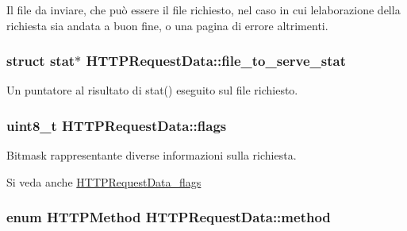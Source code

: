 Il file da inviare, che può essere il file richiesto, nel caso in cui l\textquotesingle{}elaborazione della richiesta sia andata a buon fine, o una pagina di errore altrimenti. 

\hypertarget{structHTTPRequestData_acf9615119994e2784a395f3b5b80f710}{}
\subsubsection[{file\+\_\+to\+\_\+serve\+\_\+stat}]{\setlength{\rightskip}{0pt plus 5cm}struct stat$\ast$ H\+T\+T\+P\+Request\+Data\+::file\+\_\+to\+\_\+serve\+\_\+stat}\label{structHTTPRequestData_acf9615119994e2784a395f3b5b80f710}


Un puntatore al risultato di stat() eseguito sul file richiesto. 

\hypertarget{structHTTPRequestData_ac3bd527bd3e00ce219bfa72dbaea2351}{}
\subsubsection[{flags}]{\setlength{\rightskip}{0pt plus 5cm}uint8\+\_\+t H\+T\+T\+P\+Request\+Data\+::flags}\label{structHTTPRequestData_ac3bd527bd3e00ce219bfa72dbaea2351}


Bitmask rappresentante diverse informazioni sulla richiesta. 

\begin{DoxySeeAlso}{Si veda anche}
\hyperlink{httpdata_8h_a159dd434f3cab184e5fab8365ed494ec}{H\+T\+T\+P\+Request\+Data\+\_\+flags} 
\end{DoxySeeAlso}
\hypertarget{structHTTPRequestData_af309a4c6a758b62689eeb327b5e09737}{}
\subsubsection[{method}]{\setlength{\rightskip}{0pt plus 5cm}enum {\bf H\+T\+T\+P\+Method} H\+T\+T\+P\+Request\+Data\+::method}\label{structHTTPRequestData_af309a4c6a758b62689eeb327b5e09737}


